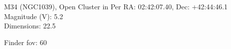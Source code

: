 \begin{block}{M34 (NGC1039), Open Cluster in Per}
    RA: 02:42:07.40, Dec: +42:44:46.1 \\ 
    Magnitude (V): 5.2 \\ 
    Dimensions: 22.5 

    Finder fov: 60 
\end{block}